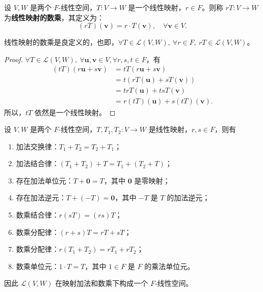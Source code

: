 \begin{definition}[线性映射的数乘]
    设 $V,W$ 是两个 $F$-线性空间，$T:V\to W$ 是一个线性映射，$r\in F$。则称 $rT:V\to W$ 为\textbf{线性映射的数乘}，其定义为：
    \[
        (rT)(\mathbf{v}) = r\cdot T(\mathbf{v}), \quad \forall \mathbf{v}\in V.
    \]
\end{definition}

\begin{proposition}
    线性映射的数乘是良定义的，也即，$\forall T\in \mathcal{L}(V,W),\ \forall r\in F,\ rT\in \mathcal{L}(V,W)$。
\end{proposition}

\begin{proof}
    $\forall T\in \mathcal{L}(V,W),\ \forall \mathbf{u},\mathbf{v}\in V, \forall r,s,t \in F$，有
    \begin{align*}
        (tT)(r\mathbf{u}+s\mathbf{v}) &= tT(r\mathbf{u}+s\mathbf{v}) \\
        &= t(rT(\mathbf{u}) + sT(\mathbf{v})) \\
        &= trT(\mathbf{u}) + tsT(\mathbf{v}) \\
        &= r(tT)(\mathbf{u}) + s(tT)(\mathbf{v}).
    \end{align*}
    所以，$tT$ 依然是一个线性映射。
\end{proof}

\begin{proposition}[线性映射的线性空间]
    设 $V,W$ 是两个 $F$-线性空间，$T,T_1,T_2:V\to W$ 是线性映射，$r,s\in F$，则有
    \begin{enumerate}
        \item 加法交换律：$T_1+T_2 = T_2+T_1$；
        \item 加法结合律：$(T_1+T_2)+T = T_1+(T_2+T)$；
        \item 存在加法单位元：$T+\mathbf{0} = T$，其中 $\mathbf{0}$ 是零映射；
        \item 存在加法逆元：$T+(-T) = \mathbf{0}$，其中 $-T$ 是 $T$ 的加法逆元；
        \item 数乘结合律：$r(sT) = (rs)T$；
        \item 数乘分配律：$ (r+s)T = rT + sT $；
        \item 数乘分配律：$ r(T_1 + T_2) = rT_1 + rT_2 $；
        \item 数乘单位元：$1\cdot T = T$，其中 $1\in F$ 是 $F$ 的乘法单位元。
    \end{enumerate}
    因此 $\mathcal{L}(V,W)$ 在映射加法和数乘下构成一个 $F$-线性空间。
    \label{prop:linear_map_linear_space}
\end{proposition}
\vspace{1em}

